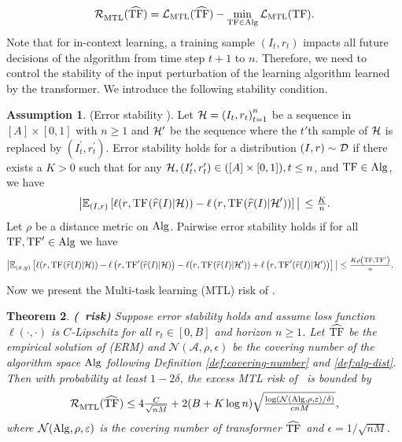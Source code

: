 \documentclass[10pt]{article}
\theoremstyle{plain}
\newtheorem{theorem}{Theorem}[section]
\theoremstyle{definition}
\newtheorem{assumption}[theorem]{Assumption}
\theoremstyle{remark}
\begin{document}
\begin{align}
\mathcal{R}^{}_{\mathrm{MTL}}(\widehat{\mathrm{TF}})=\mathcal{L}_{\mathrm{MTL}}(\widehat{\mathrm{TF}})-\min_{\mathrm{TF} \in \mathrm{Alg}} \mathcal{L}_{\mathrm{MTL}}(\mathrm{TF}) .\label{eq:risk}
\end{align}
Note that for in-context learning, a training sample $\left(I_t, r_t\right)$ impacts all future decisions of the algorithm from time step $t+1$ to $n$. Therefore, we need to control the stability of the input perturbation of the learning algorithm learned by the transformer. We introduce the following stability condition.
\begin{assumption}
\label{assm:stability-assumption}
(Error stability \citep{bousquet2002stability, li2023transformers}). Let $\mathcal{H}=\left(I_t, r_t\right)_{t=1}^n$ be a sequence in $[A] \times [0,1]$ with $n \geq 1$ and $\mathcal{H}^{\prime}$ be the sequence where the $t'$th sample of $\mathcal{H}$ is replaced by $\left(I_t^{\prime}, r_t^{\prime}\right)$. Error stability holds for a distribution $(I, r)\sim\mathcal{D}$ if there exists a $K>0$ such that for any $\mathcal{H},\left(I_t^{\prime}, r_t^{\prime}\right) \in([A] \times [0,1]), t \leq n$, and $\mathrm{TF} \in \mathrm{Alg}$, we have
\begin{align*}
\big\lvert \mathbb{E}_{(I, r)}\left[\ell(r_{},\mathrm{TF}_{}(\widehat{r}_{}(I_{})|\mathcal{H}))-\ell\left(r_{},\mathrm{TF}_{}(\widehat{r}_{}(I_{})|\mathcal{H}^\prime)\right)\right] \big\rvert\, \leq \tfrac{K}{n}.
\end{align*}
Let $\rho$ be a distance metric on $\mathrm{Alg}$. Pairwise error stability holds if for all $\mathrm{TF}, \mathrm{TF}^{\prime} \in \mathrm{Alg}$ we have
\begin{align*}
\begin{aligned}
& \big\lvert \mathbb{E}_{(x, y)}\left[\ell(r_{},\mathrm{TF}_{}(\widehat{r}_{}(I_{})|\mathcal{H}))-\ell\left(r_{},\mathrm{TF}'_{}(\widehat{r}_{}(I_{})|\mathcal{H})\right)-\ell(r_{},\mathrm{TF}_{}(\widehat{r}_{}(I_{})|\mathcal{H}'))+\ell\left(r_{},\mathrm{TF}'_{}(\widehat{r}_{}(I_{})|\mathcal{H}')\right)\right] \big\rvert \leq \tfrac{K \rho\left(\mathrm{TF}, \mathrm{TF}^{\prime}\right)}{n}.
\end{aligned}
\end{align*}
\end{assumption}
Now we present the Multi-task learning (MTL) risk of \predt.
\begin{theorem}
\label{thm:multi-task-risk}\textbf{(\pred\ risk)}
    Suppose error stability  holds and assume loss function $\ell(\cdot,\cdot)$ is $C$-Lipschitz for all $r_t \in [0,B]$ and horizon $n\geq 1$. Let $\widehat{\mathrm{TF}}$ be the empirical solution of (ERM) and $\mathcal{N}(\mathcal{A}, \rho, \epsilon)$ be the covering number of the algorithm space $\mathrm{Alg}$ following Definition \ref{def:covering-number} and \ref{def:alg-dist}. Then with probability at least $1-2 \delta$, the excess MTL risk of \predt\ is bounded by
    \begin{align*}
        \mathcal{R}^{}_{\mathrm{MTL}}(\widehat{\mathrm{TF}}_{}) \leq 4 \tfrac{C}{\sqrt{nM}} +2(B+K \log n) \sqrt{\tfrac{\log (\mathcal{N}(\mathrm{Alg}, \rho, \varepsilon) / \delta)}{c n M}},
    \end{align*}
    where $\mathcal{N}(\mathrm{Alg}, \rho, \varepsilon)$ is the covering number of transformer $\widehat{\mathrm{TF}}_{}$ and $\epsilon = 1/\sqrt{nM}$.
\end{theorem}
\end{document}
